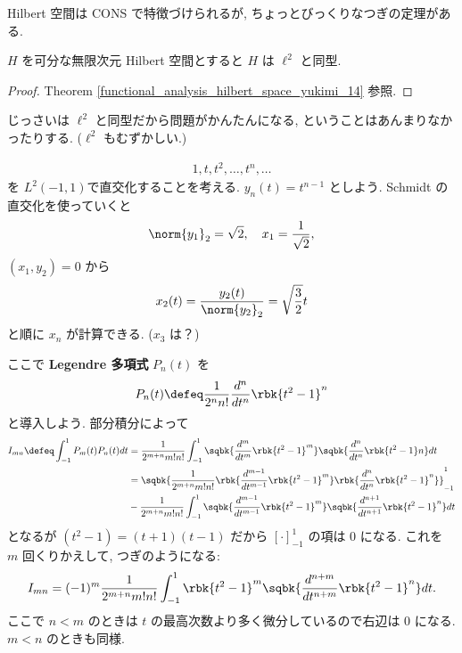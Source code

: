 \documentclass[openany, a4paper, oneside]{jsbook}
\begin{document}
Hilbert 空間は CONS で特徴づけられるが,
ちょっとびっくりなつぎの定理がある.
\begin{thm}
 $H$ を可分な無限次元 Hilbert 空間とすると $H$ は $\ell^2$ と同型.
\end{thm}
\begin{proof}
Theorem \ref{functional_analysis_hilbert_space_yukimi_14} 参照.
\end{proof}
じっさいは $\ell^2$ と同型だから問題がかんたんになる,
ということはあんまりなかったりする.
($\ell^2$ もむずかしい.)

\begin{ex}
\begin{align}
 1, t, t^2, \dots, t^n, \dots
\end{align}
を $L^2(-1, 1) $で直交化することを考える.
$y_n(t) = t^{n-1}$ としよう.
Schmidt の直交化を使っていくと
\begin{align}
 \norm{y_1}_2
 =
 \sqrt{2}, \quad
 x_1
 =
 \frac{1}{\sqrt{2}},
\end{align}
$(x_1, y_2) = 0$ から
\begin{align}
 x_2(t)
 =
 \frac{y_2(t)}{\norm{y_2}_2}
 =
 \sqrt{\frac{3}{2}}t
\end{align}
と順に $x_n$ が計算できる.
($x_3$ は？)

ここで \textbf{Legendre 多項式} $P_n(t)$ を
\begin{align}
 P_n(t)
 \defeq
 \frac{1}{2^n n!} \frac{d^n}{dt^n} \rbk{t^2 - 1}^n
\end{align}
と導入しよう.
部分積分によって
\begin{align}
 I_{mn}
 \defeq
 \int_{-1}^1 P_m(t) P_n(t) dt
 &=
 \frac{1}{2^{m+n} m!n!} \int_{-1}^1
  \sqbk{\frac{d^m}{dt^m} \rbk{t^2 - 1}^m}
  \sqbk{\frac{d^n}{dt^n} \rbk{t^2 - 1}n} dt \\
 &=
 \sqbk{\frac{1}{2^{m+n} m!n!} \rbk{\frac{d^{m-1}}{dt^{m-1}} \rbk{t^2 - 1}^m} \rbk{\frac{d^n}{dt^n} \rbk{t^2 - 1}^n}}_{-1}^1 \\
 &-
  \frac{1}{2^{m+n} m!n!} \int_{-1}^1
   \sqbk{\frac{d^{m-1}}{dt^{m-1}} \rbk{t^2 - 1}^m}
   \sqbk{\frac{d^{n+1}}{dt^{n+1}} \rbk{t^2 - 1}^n} dt
\end{align}
となるが $(t^2 - 1) = (t+1)(t-1)$ だから $[\cdot]_{-1}^1$ の項は $0$ になる.
これを $m$ 回くりかえして, つぎのようになる:
\begin{align}
 I_{mn}
 =
 (-1)^m \frac{1}{2^{m+n} m!n!} \int_{-1}^1
  \rbk{t^2 - 1}^m
  \sqbk{\frac{d^{n+m}}{dt^{n+m}} \rbk{t^2 - 1}^n} dt.
\end{align}
ここで $n<m$ のときは $t$ の最高次数より多く微分しているので右辺は $0$ になる.
$m<n$ のときも同様.


\end{ex}
\end{document}
